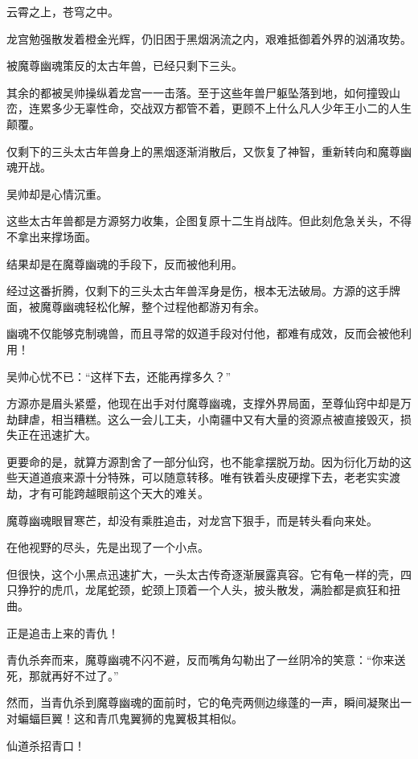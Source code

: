 
\begin{this_body}

云霄之上，苍穹之中。

龙宫勉强散发着橙金光辉，仍旧困于黑烟涡流之内，艰难抵御着外界的汹涌攻势。

被魔尊幽魂策反的太古年兽，已经只剩下三头。

其余的都被吴帅操纵着龙宫一一击落。至于这些年兽尸躯坠落到地，如何撞毁山峦，连累多少无辜性命，交战双方都管不着，更顾不上什么凡人少年王小二的人生颠覆。

仅剩下的三头太古年兽身上的黑烟逐渐消散后，又恢复了神智，重新转向和魔尊幽魂开战。

吴帅却是心情沉重。

这些太古年兽都是方源努力收集，企图复原十二生肖战阵。但此刻危急关头，不得不拿出来撑场面。

结果却是在魔尊幽魂的手段下，反而被他利用。

经过这番折腾，仅剩下的三头太古年兽浑身是伤，根本无法破局。方源的这手牌面，被魔尊幽魂轻松化解，整个过程他都游刃有余。

幽魂不仅能够克制魂兽，而且寻常的奴道手段对付他，都难有成效，反而会被他利用！

吴帅心忧不已：“这样下去，还能再撑多久？”

方源亦是眉头紧蹙，他现在出手对付魔尊幽魂，支撑外界局面，至尊仙窍中却是万劫肆虐，相当糟糕。这么一会儿工夫，小南疆中又有大量的资源点被直接毁灭，损失正在迅速扩大。

更要命的是，就算方源割舍了一部分仙窍，也不能拿摆脱万劫。因为衍化万劫的这些天道道痕来源十分特殊，可以随意转移。唯有铁着头皮硬撑下去，老老实实渡劫，才有可能跨越眼前这个天大的难关。

魔尊幽魂眼冒寒芒，却没有乘胜追击，对龙宫下狠手，而是转头看向来处。

在他视野的尽头，先是出现了一个小点。

但很快，这个小黑点迅速扩大，一头太古传奇逐渐展露真容。它有龟一样的壳，四只狰狞的虎爪，龙尾蛇颈，蛇颈上顶着一个人头，披头散发，满脸都是疯狂和扭曲。

正是追击上来的青仇！

青仇杀奔而来，魔尊幽魂不闪不避，反而嘴角勾勒出了一丝阴冷的笑意：“你来送死，那就再好不过了。”

然而，当青仇杀到魔尊幽魂的面前时，它的龟壳两侧边缘蓬的一声，瞬间凝聚出一对蝙蝠巨翼！这和青爪鬼翼狮的鬼翼极其相似。

仙道杀招青口！


\end{this_body}
